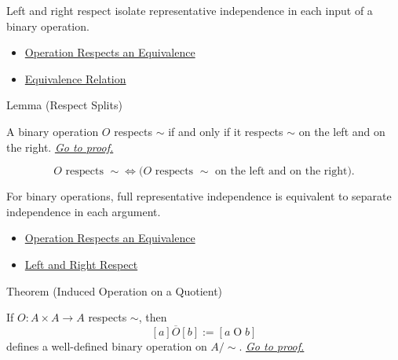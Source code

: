 \begin{remark*}[Interpretation]
Left and right respect isolate representative independence in each input of a
binary operation.
\end{remark*}

\begin{dependencies}
\begin{itemize}
  \item \hyperref[def:operation-respects-equivalence]{Operation Respects an Equivalence}
  \item \hyperref[def:equivalence-relation]{Equivalence Relation}
\end{itemize}
\end{dependencies}

\begin{lemmabox}{Lemma (Respect Splits)}
\begin{lemma}
\label{lem:respect-splits}
A binary operation $O$ respects $\sim$ if and only if it respects $\sim$ on
the left and on the right.
\hyperref[prf:respect-splits]{\textit{Go to proof.}}
\end{lemma}
\end{lemmabox}

\begin{remark*}
\[
O \text{ respects } \sim
\Longleftrightarrow
\bigl(O \text{ respects } \sim \text{ on the left and on the right}\bigr).
\]
\end{remark*}

\begin{remark*}[Interpretation]
For binary operations, full representative independence is equivalent to
separate independence in each argument.
\end{remark*}

\begin{dependencies}
\begin{itemize}
  \item \hyperref[def:operation-respects-equivalence]{Operation Respects an Equivalence}
  \item \hyperref[def:left-right-respect-equivalence]{Left and Right Respect}
\end{itemize}
\end{dependencies}

\begin{theorembox}{Theorem (Induced Operation on a Quotient)}
\begin{theorem}
\label{thm:induced-operation-on-quotient}
If $O:A\times A\to A$ respects $\sim$, then
\[
[a]\mathbin{\overline{O}}[b]:=[a\mathbin{O}b]
\]
defines a well-defined binary operation on $A/{\sim}$.
\hyperref[prf:induced-operation-on-quotient]{\textit{Go to proof.}}
\end{theorem}
\end{theorembox}

